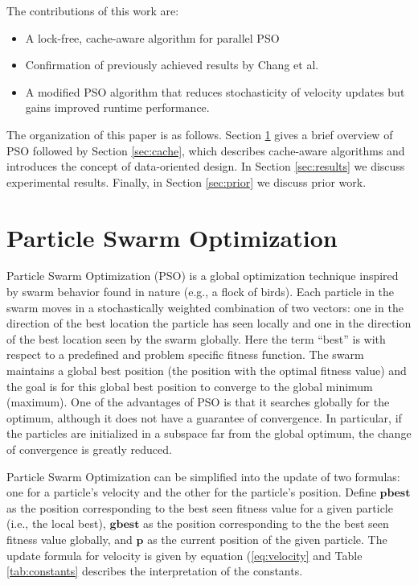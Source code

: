 The contributions of this work are:
\begin{itemize}
\item A lock-free, cache-aware algorithm for parallel PSO
\item Confirmation of previously achieved results by Chang et
  al. \cite{cache-pso}
\item A modified PSO algorithm that reduces stochasticity of velocity updates
  but gains improved runtime performance.  
\end{itemize}

The organization of this paper is as follows. Section \ref{sec:pso} gives a
brief overview of PSO followed by Section \ref{sec:cache}, which describes
cache-aware algorithms and introduces the concept of data-oriented design. In
Section \ref{sec:results} we discuss experimental results. Finally, in Section
\ref{sec:prior} we discuss prior work.

\section{Particle Swarm Optimization}\label{sec:pso}
Particle Swarm Optimization (PSO) \cite{pso} is a global optimization technique
inspired by swarm behavior found in nature (e.g., a flock of birds).
Each particle in the swarm moves in a stochastically weighted
combination of two vectors: one in the direction of the best location the
particle has seen locally and one in the direction of the best location seen by
the swarm globally. Here the term ``best'' is with respect to a predefined and
problem specific fitness function.
The swarm maintains a global best position (the position
with the optimal fitness value) and the goal is for this global best position to
converge to the global minimum (maximum).
One of the advantages of PSO is that it searches globally for the optimum,
although it does not have a guarantee of convergence.
In particular, if the particles are initialized in a subspace far from the
global optimum, the change of convergence is greatly reduced.

Particle Swarm Optimization can be simplified into the update of two formulas:
one for a particle's velocity and the other for the particle's position. Define
$\textbf{pbest}$ as the position corresponding to the best seen fitness value
for a given particle (i.e., the local best), $\textbf{gbest}$ as the position
corresponding to the the best seen fitness value globally, and $\textbf{p}$ as
the current position of the given particle. The update formula for velocity is
given by equation (\ref{eq:velocity} and Table \ref{tab:constants} describes
the interpretation of the constants.

